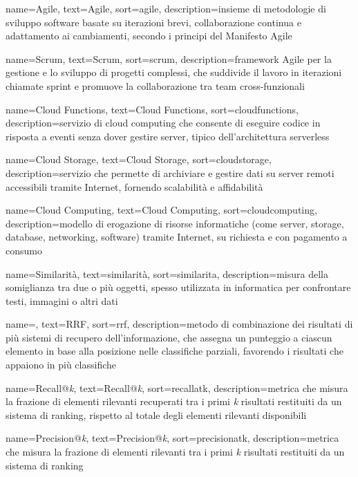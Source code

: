  {
    name=Agile,
    text=Agile,
    sort=agile,
    description={insieme di metodologie di sviluppo software basate su iterazioni brevi, collaborazione continua e adattamento ai cambiamenti, secondo i principi del Manifesto Agile}
}

 {
    name=Scrum,
    text=Scrum,
    sort=scrum,
    description={framework Agile per la gestione e lo sviluppo di progetti complessi, che suddivide il lavoro in iterazioni chiamate sprint e promuove la collaborazione tra team cross-funzionali}
}

 {
    name=Cloud Functions,
    text=Cloud Functions,
    sort=cloudfunctions,
    description={servizio di cloud computing che consente di eseguire codice in risposta a eventi senza dover gestire server, tipico dell'architettura serverless}
}

 {
    name=Cloud Storage,
    text=Cloud Storage,
    sort=cloudstorage,
    description={servizio che permette di archiviare e gestire dati su server remoti accessibili tramite Internet, fornendo scalabilità e affidabilità}
}

 {
    name=Cloud Computing,
    text=Cloud Computing,
    sort=cloudcomputing,
    description={modello di erogazione di risorse informatiche (come server, storage, database, networking, software) tramite Internet, su richiesta e con pagamento a consumo}
}

 {
    name=Similarità,
    text=similarità,
    sort=similarita,
    description={misura della somiglianza tra due o più oggetti, spesso utilizzata in informatica per confrontare testi, immagini o altri dati}
}

 {
    name=,
    text=RRF,
    sort=rrf,
    description={metodo di combinazione dei risultati di più sistemi di recupero dell'informazione, che assegna un punteggio a ciascun elemento in base alla posizione nelle classifiche parziali, favorendo i risultati che appaiono in più classifiche}
}

 {
    name=Recall@\emph{k},
    text=Recall@\emph{k},
    sort=recallatk,
    description={metrica che misura la frazione di elementi rilevanti recuperati tra i primi \emph{k} risultati restituiti da un sistema di ranking, rispetto al totale degli elementi rilevanti disponibili}
}

 {
    name=Precision@\emph{k},
    text=Precision@\emph{k},
    sort=precisionatk,
    description={metrica che misura la frazione di elementi rilevanti tra i primi \emph{k} risultati restituiti da un sistema di ranking}
}

